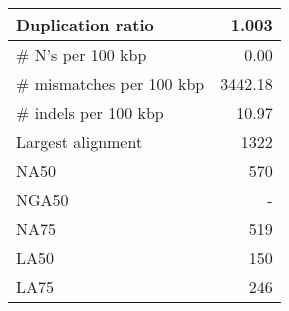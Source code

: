 \documentclass[12pt,a4paper]{article}
\begin{document}
\begin{table}[ht]
\begin{center}
\begin{tabular}{|l*{1}{|r}|}
Duplication ratio & 1.003 \\ \hline
\# N's per 100 kbp & 0.00 \\ \hline
\# mismatches per 100 kbp & 3442.18 \\ \hline
\# indels per 100 kbp & 10.97 \\ \hline
Largest alignment & 1322 \\ \hline
NA50 & 570 \\ \hline
NGA50 & - \\ \hline
NA75 & 519 \\ \hline
LA50 & 150 \\ \hline
LA75 & 246 \\ \hline
\end{tabular}
\end{center}
\end{table}
\end{document}
